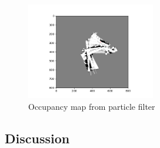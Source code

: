 \documentclass[a4paper]{article}
\begin{document}
\begin{figure}[h]
    \centering
    \includegraphics[width=0.5\textwidth]{map_4000.png}
    \caption{Occupancy map from particle filter}
    \label{fig:particle_filter}
\end{figure}
\subsection{Discussion}
\end{document}
